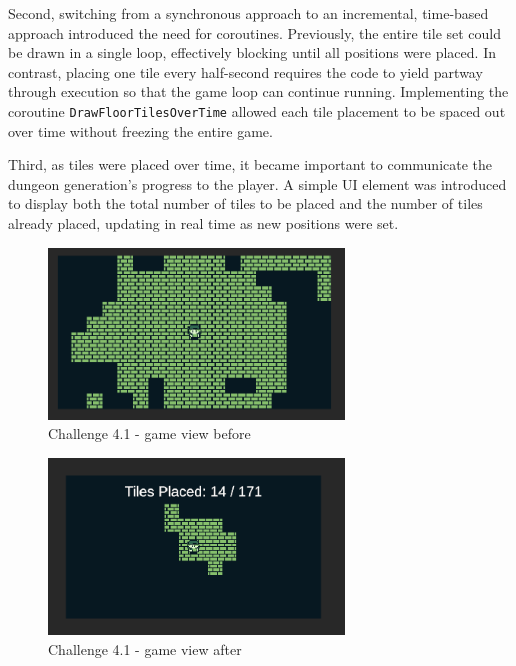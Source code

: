 \documentclass[a4paper, 12pt, one column, aas_macros]{article}
\begin{document}
Second, switching from a synchronous approach to an incremental, time-based approach introduced the need for coroutines. Previously, the entire tile set could be drawn in a single loop, effectively blocking until all positions were placed. In contrast, placing one tile every half-second requires the code to yield partway through execution so that the game loop can continue running. Implementing the coroutine \texttt{DrawFloorTilesOverTime} allowed each tile placement to be spaced out over time without freezing the entire game.

Third, as tiles were placed over time, it became important to communicate the dungeon generation’s progress to the player. A simple UI element was introduced to display both the total number of tiles to be placed and the number of tiles already placed, updating in real time as new positions were set.

\begin{figure}[htbp]
  \centering
  \includegraphics[width=0.7\textwidth]{images/difficulty-1-before.png}
  \caption{Challenge 4.1 - game view before}
  \label{fig:difficulty-1-before}
\end{figure}

\begin{figure}[htbp]
  \centering
  \includegraphics[width=0.7\textwidth]{images/difficulty-1-after.png}
  \caption{Challenge 4.1 - game view after}
  \label{fig:difficulty-1-after}
\end{figure}
\end{document}
